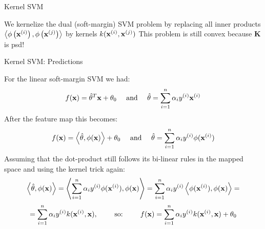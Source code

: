 \documentclass[11pt,compress,t,notes=noshow, xcolor=table]{beamer}
\begin{document}
\begin{frame}{Kernel SVM}


We kernelize the dual (soft-margin) SVM problem by replacing all inner products $\left\langle \phi\left(\mathbf{x}^{(i)}\right), \phi\left(\mathbf{x}^{(j)}\right) \right\rangle$ by kernels $k(\mathbf{x}^{(i)}, \mathbf{x}^{(j)})$
This problem is still convex because $\bm{K}$ is psd!

\end{frame}

\begin{frame}{Kernel SVM: Predictions}

For the linear soft-margin SVM we had:
  $$ f(\mathbf{x}) = \hat{\theta}^T \mathbf{x} + \theta_0 \quad \text{ and } \quad \hat{\theta} = \sum\limits_{i=1}^n \alpha_i y^{(i)} \mathbf{x}^{(i)} $$  
After the feature map this becomes:
$$ f(\mathbf{x}) = \left\langle \hat{\theta}, \phi(\mathbf{x}) \right\rangle + \theta_0 \quad \text{ and } \quad \hat{\theta} = \sum\limits_{i=1}^n \alpha_i y^{(i)} \phi(\mathbf{x}^{(i)}) $$  
Assuming that the dot-product still follows its bi-linear rules in the mapped space and using the kernel
trick again:
$$ 
\left\langle \hat{\theta}, \phi(\mathbf{x}) \right\rangle = 
\left\langle \sum\limits_{i=1}^n \alpha_i y^{(i)} \phi(\mathbf{x}^{(i)}), \phi(\mathbf{x}) \right\rangle =
\sum\limits_{i=1}^n \alpha_i y^{(i)} \left\langle \phi(\mathbf{x}^{(i)}), \phi(\mathbf{x}) \right\rangle =
$$
$$
= \sum\limits_{i=1}^n \alpha_i y^{(i)} k(\mathbf{x}^{(i)}, \mathbf{x}), \qquad \text{ so: } \qquad f(\mathbf{x}) = \sum\limits_{i=1}^n \alpha_i y^{(i)} k(\mathbf{x}^{(i)}, \mathbf{x})  + \theta_0
$$  
  

\end{frame}
\end{document}

